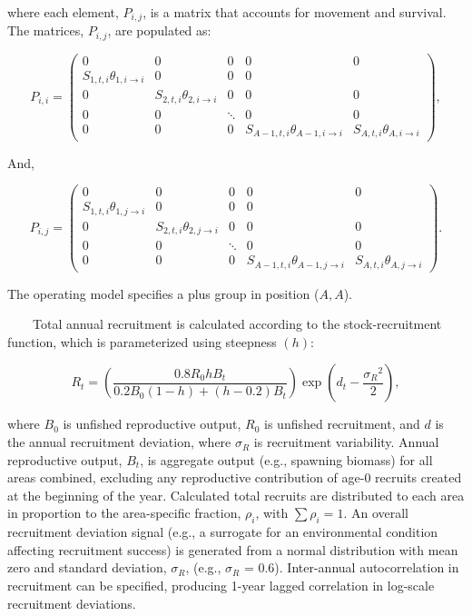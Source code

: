 \documentclass[
]{book}
\begin{document}
where each element, \(P_{i,j}\), is a matrix that accounts for movement and survival. The matrices, \(P_{i,j}\), are populated as:

\[
P_{i,i} = \begin{pmatrix}
0 & 0 & 0 & 0 & 0 \\
S_{1,t,i}\theta_{1,i\rightarrow i} & 0 & 0 & 0 \\
0 & S_{2,t,i}\theta_{2,i\rightarrow i} & 0 & 0 & 0 \\
0 & 0 & \ddots & 0 & 0 \\
0 & 0 & 0 & S_{A-1,t,i}\theta_{A-1,i\rightarrow i} & S_{A,t,i}\theta_{A,i\rightarrow i}
\end{pmatrix}, \tag{eq. 6} \label{eq:sixth} 
\]

And,

\[
P_{i,j} = \begin{pmatrix}
0 & 0 & 0 & 0 & 0 \\
S_{1,t,i}\theta_{1,j\rightarrow i} & 0 & 0 & 0 \\
0 & S_{2,t,i}\theta_{2,j\rightarrow i} & 0 & 0 & 0 \\
0 & 0 & \ddots & 0 & 0 \\
0 & 0 & 0 & S_{A-1,t,i}\theta_{A-1,j\rightarrow i} & S_{A,t,i}\theta_{A,j\rightarrow i}
\end{pmatrix}. \tag{eq. 7} \label{eq:seventh} 
\]

The operating model specifies a plus group in position (\(A,A\)).\\
\strut ~~~~Total annual recruitment is calculated according to the \citet{beverton_dynamics_1957} stock-recruitment function, which is parameterized using steepness \((h)\):

\[
R_t = \left(\frac{0.8R_0hB_t}{0.2B_0\left(1-h\right) + \left(h-0.2\right)B_t}\right) \exp{\left(d_t - \frac{{\sigma_R}^2}{2}\right)},  \tag{eq. 8} \label{eq:eighth}
\]

where \(B_0\) is unfished reproductive output, \(R_0\) is unfished recruitment, and \(d\) is the annual recruitment deviation, where \(\sigma_R\) is recruitment variability. Annual reproductive output, \(B_t\), is aggregate output (e.g., spawning biomass) for all areas combined, excluding any reproductive contribution of age-0 recruits created at the beginning of the year. Calculated total recruits are distributed to each area in proportion to the area-specific fraction, \(\rho_i\), with \(\sum\rho_i=1\). An overall recruitment deviation signal (e.g., a surrogate for an environmental condition affecting recruitment success) is generated from a normal distribution with mean zero and standard deviation, \(\sigma_R\), (e.g., \(\sigma_R\) = 0.6). Inter-annual autocorrelation in recruitment can be specified, producing 1-year lagged correlation in log-scale recruitment deviations.
\end{document}
